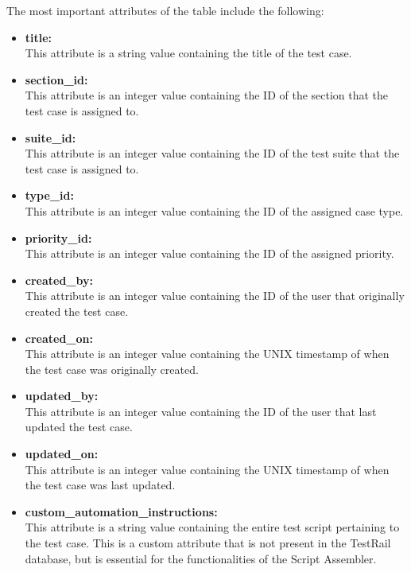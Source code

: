 The most important attributes of the table include the following:~\cite{TRCases}
\begin{itemize}
    \item \textbf{title:} \\
    This attribute is a string value containing the title of the test case.

    \item \textbf{section_id:} \\
    This attribute is an integer value containing the ID of the section that the test case is assigned to.

    \item \textbf{suite_id:} \\
    This attribute is an integer value containing the ID of the test suite that the test case is assigned to.

    \item \textbf{type_id:} \\
    This attribute is an integer value containing the ID of the assigned case type.

    \item \textbf{priority_id:} \\
    This attribute is an integer value containing the ID of the assigned priority.

    \item \textbf{created_by:} \\
    This attribute is an integer value containing the ID of the user that originally created the test case.

    \item \textbf{created_on:} \\
    This attribute is an integer value containing the UNIX timestamp of when the test case was originally created.

    \item \textbf{updated_by:} \\
    This attribute is an integer value containing the ID of the user that last updated the test case.

    \item \textbf{updated_on:} \\
    This attribute is an integer value containing the UNIX timestamp of when the test case was last updated.

    \item \textbf{custom_automation_instructions:} \\
    This attribute is a string value containing the entire test script pertaining to the test case. This is a custom attribute that is not present in the TestRail database, but is essential for the functionalities of the Script Assembler.
\end{itemize}

